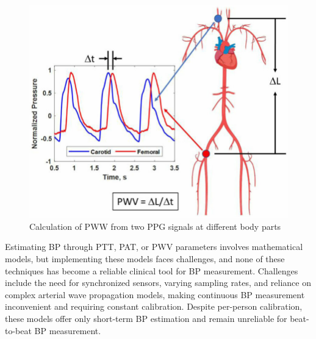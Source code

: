 \begin{figure}
    \begin{minipage}[c]{0.5\textwidth}
        \includegraphics[width=\textwidth]{images/sp/pww}
    \end{minipage}\hfill
    \begin{minipage}[c]{0.5\textwidth}
        \centering %
        \caption{Calculation of PWW from two PPG signals at different body parts~\cite{urbanUnderstandingArterialBiomechanics2023}}
        \label{fig:pww}
    \end{minipage}
\end{figure}

Estimating BP through PTT, PAT, or PWV parameters involves mathematical models, but implementing these models faces challenges, and none of these techniques has become a reliable clinical tool for BP measurement.
Challenges include the need for synchronized sensors, varying sampling rates, and reliance on complex arterial wave propagation models, making continuous BP measurement inconvenient and requiring constant calibration.
Despite per-person calibration, these models offer only short-term BP estimation and remain unreliable for beat-to-beat BP measurement.


